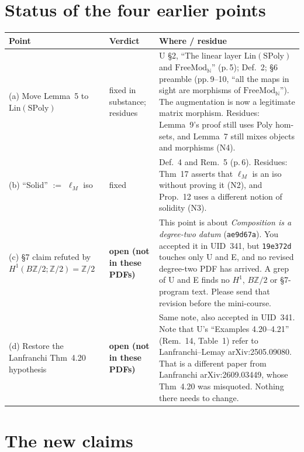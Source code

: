 \documentclass[11pt]{article}
\newcommand{\N}{\mathbb{N}}
\newcommand{\Z}{\mathbb{Z}}
\begin{document}
\section{Status of the four earlier points}
\begin{center}\small
\begin{tabular}{p{4.1cm}p{2.4cm}p{8.6cm}}
\toprule
Point & Verdict & Where / residue\\\midrule
(a) Move Lemma~5 to $\mathrm{Lin}(\mathrm{SPoly})$ & fixed in substance; residues &
U \S2, ``The linear layer $\mathrm{Lin}(\mathrm{SPoly})$ and $\mathrm{FreeMod}_\N$'' (p.\,5); Def.~2;
\S6 preamble (pp.\,9--10, ``all the maps in sight are morphisms of $\mathrm{FreeMod}_\N$''). The
augmentation is now a legitimate matrix morphism. Residues: Lemma~9's proof still uses Poly hom-sets,
and Lemma~7 still mixes objects and morphisms (N4).\\
(b) ``Solid'' $:=$ $\ell_M$ iso & fixed & Def.~4 and Rem.~5 (p.\,6). Residues: Thm~17 asserts that
$\ell_M$ is an iso without proving it (N2), and Prop.~12 uses a different notion of solidity (N3).\\
(c) \S7 claim refuted by $H^1(B\Z/2;\Z/2)=\Z/2$ & \textbf{open (not in these PDFs)} & This point is
about \emph{Composition is a degree-two datum} (\texttt{ae9d67a}). You accepted it in UID~341, but
\texttt{19e372d} touches only U and E, and no revised degree-two PDF has arrived. A grep of U and E
finds no $H^1$, $B\Z/2$ or \S7-program text. Please send that revision before the mini-course.\\
(d) Restore the Lanfranchi Thm~4.20 hypothesis & \textbf{open (not in these PDFs)} & Same note,
also accepted in UID~341. Note that U's ``Examples 4.20--4.21'' (Rem.~14, Table~1) refer to
Lanfranchi--Lemay arXiv:2505.09080. That is a different paper from Lanfranchi arXiv:2609.03449, whose
Thm~4.20 was misquoted. Nothing there needs to change.\\
\bottomrule
\end{tabular}
\end{center}

\section{The new claims}
\end{document}
